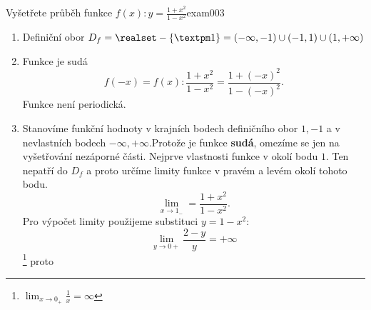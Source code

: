 \begin{mathexam}{Vyšetřete průběh funkce \(f(x):y=\frac{1+x^2}{1-x^2}\)}{exam003}
  \begin{enumerate}[noitemsep]
    \item Definiční obor $D_f=\realset-\{±1\}=(-\infty,-1)\cup(-1,1)\cup(1,+\infty)$
    \item Funkce je sudá $$f(-x)=f(x): \frac{1+x^2}{1-x^2}=\frac{1+(-x)^2}{1-(-x)^2}.$$ Funkce není
        periodická.
    \item Stanovíme funkční hodnoty v krajních bodech definičního obor $1, -1$ a v nevlastních
        bodech $-\infty,+\infty$.Protože je funkce \textbf{sudá}, omezíme se jen na vyšetřování
        nezáporné části. Nejprve vlastnosti fun\-kce v okolí bodu $1$. Ten nepatří do $D_f$ a proto
        určíme limity funkce v pravém a levém okolí tohoto bodu. $$\lim_{x\to
        1_{-}}=\frac{1+x^2}{1-x^2}.$$ Pro výpočet limity použijeme substituci $y=1-x^2$: 
        $$\lim_{y\to0+}\frac{2-y}{y}=+\infty$$ \footnote{$\lim_{x\to0_+}\frac{1}{x}=\infty$} proto
        

\end{enumerate}
\end{mathexam}
